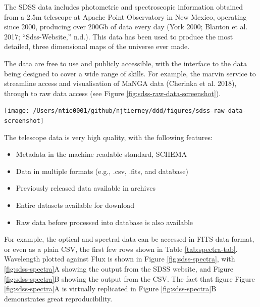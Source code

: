 \documentclass[
]{article}
\providecommand{\tightlist}{%
  \setlength{\itemsep}{0pt}\setlength{\parskip}{0pt}}
\let\origfigure\figure
\let\endorigfigure\endfigure
\renewenvironment{figure}[1][2] {
    \expandafter\origfigure\expandafter[H]
} {
    \endorigfigure
}
\begin{document}
The SDSS data includes photometric and spectroscopic information obtained from a 2.5m telescope at Apache Point Observatory in New Mexico, operating since 2000, producing over 200Gb of data every day (York 2000; Blanton et al. 2017; ``Sdss-Website,'' n.d.). This data has been used to produce the most detailed, three dimensional maps of the universe ever made.

The data are free to use and publicly accessible, with the interface to the data being designed to cover a wide range of skills. For example, the marvin service to streamline access and visualisation of MaNGA data (Cherinka et al. 2018), through to raw data access (see Figure \ref{fig:sdss-raw-data-screenshot}).

\begin{figure}

{\centering \texttt{[image: /Users/ntie0001/github/njtierney/ddd/figures/sdss-raw-data-screenshot]} 

}

\caption{Screenshot of Raw data avaialbe through DR15 FITS.}\label{fig:sdss-raw-data-screenshot}
\end{figure}

The telescope data is very high quality, with the following features:

\begin{itemize}
\tightlist
\item
  Metadata in the machine readable standard, SCHEMA
\item
  Data in multiple formats (e.g., .csv, .fits, and database)
\item
  Previously released data available in archives
\item
  Entire datasets available for download
\item
  Raw data before processed into database is also available
\end{itemize}

For example, the optical and spectral data can be accessed in FITS data format, or even as a plain CSV, the first few rows shown in Table \ref{tab:spectra-tab}. Wavelength plotted against Flux is shown in Figure \ref{fig:sdss-spectra}, with \ref{fig:sdss-spectra}A showing the output from the SDSS website, and Figure \ref{fig:sdss-spectra}B showing the output from the CSV. The fact that figure Figure \ref{fig:sdss-spectra}A is virtually replicated in Figure \ref{fig:sdss-spectra}B demonstrates great reproducibility.
\end{document}
